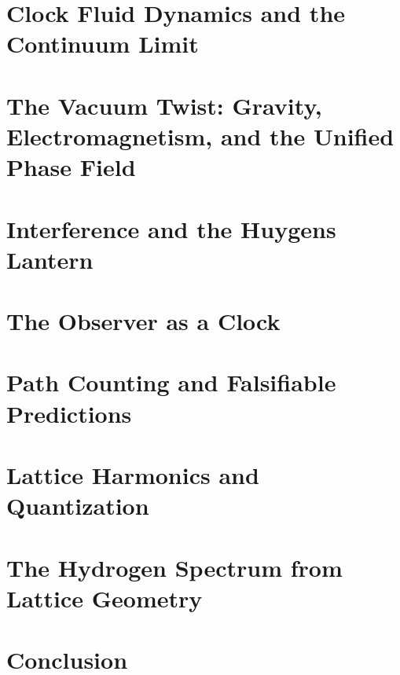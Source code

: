 \documentclass[12pt, letterpaper]{article}
\begin{document}
\section{Clock Fluid Dynamics and the Continuum Limit}


\section{The Vacuum Twist: Gravity, Electromagnetism, and the Unified Phase Field}


\section{Interference and the Huygens Lantern}


\section{The Observer as a Clock}


\section{Path Counting and Falsifiable Predictions}


\section{Lattice Harmonics and Quantization}




\section{The Hydrogen Spectrum from Lattice Geometry}


\section{Conclusion}

\end{document}
